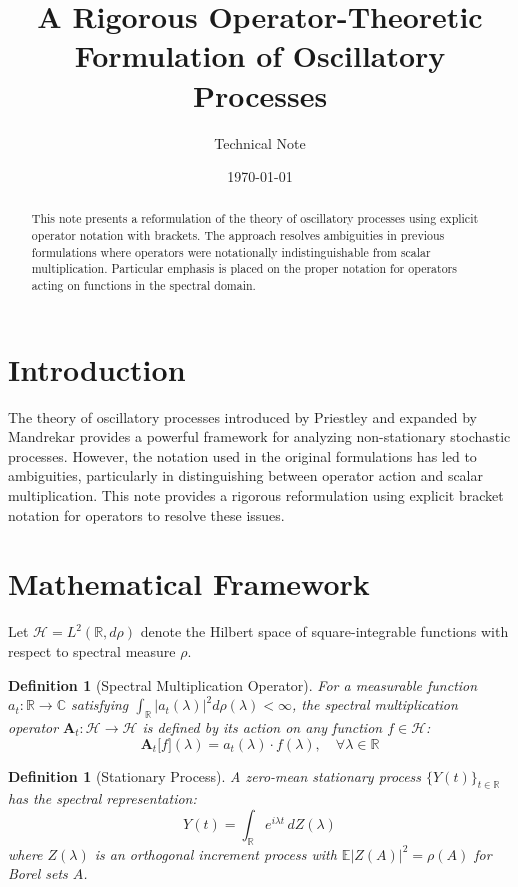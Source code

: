 \documentclass{article}
\title{A Rigorous Operator-Theoretic Formulation of Oscillatory Processes}
\author{Technical Note}
\date{\today}
\newtheorem{definition}[theorem]{Definition}
\begin{document}
\maketitle

\begin{abstract}
This note presents a reformulation of the theory of oscillatory processes using explicit operator notation with brackets. The approach resolves ambiguities in previous formulations where operators were notationally indistinguishable from scalar multiplication. Particular emphasis is placed on the proper notation for operators acting on functions in the spectral domain.
\end{abstract}

\section{Introduction}

The theory of oscillatory processes introduced by Priestley and expanded by Mandrekar provides a powerful framework for analyzing non-stationary stochastic processes. However, the notation used in the original formulations has led to ambiguities, particularly in distinguishing between operator action and scalar multiplication. This note provides a rigorous reformulation using explicit bracket notation for operators to resolve these issues.

\section{Mathematical Framework}

Let $\mathcal{H} = L^2(\mathbb{R}, d\rho)$ denote the Hilbert space of square-integrable functions with respect to spectral measure $\rho$.

\begin{definition}[Spectral Multiplication Operator]
For a measurable function $a_t: \mathbb{R} \to \mathbb{C}$ satisfying $\int_{\mathbb{R}} |a_t(\lambda)|^2 d\rho(\lambda) < \infty$, the spectral multiplication operator $\mathbf{A}_t: \mathcal{H} \to \mathcal{H}$ is defined by its action on any function $f \in \mathcal{H}$:
\begin{equation}
\mathbf{A}_t\big[f\big](\lambda) = a_t(\lambda) \cdot f(\lambda), \quad \forall \lambda \in \mathbb{R}
\end{equation}
\end{definition}

\begin{definition}[Stationary Process]
A zero-mean stationary process $\{Y(t)\}_{t \in \mathbb{R}}$ has the spectral representation:
\begin{equation}
Y(t) = \int_{\mathbb{R}} e^{i\lambda t} \, dZ(\lambda)
\end{equation}
where $Z(\lambda)$ is an orthogonal increment process with $\mathbb{E}|Z(A)|^2 = \rho(A)$ for Borel sets $A$.
\end{definition}
\end{document}
